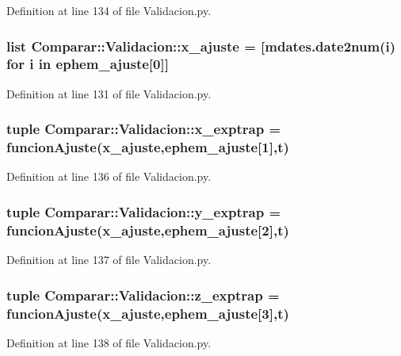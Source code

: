 \-Definition at line 134 of file \-Validacion.\-py.

\subsubsection[{x\-\_\-ajuste}]{\setlength{\rightskip}{0pt plus 5cm}list {\bf \-Comparar\-::\-Validacion\-::x\-\_\-ajuste} = [mdates.\-date2num(i) for i in {\bf ephem\-\_\-ajuste}[0]]}\label{namespace_comparar_1_1_validacion_aca12cea5660c813bec7e35242b7fd3ea}


\-Definition at line 131 of file \-Validacion.\-py.

\subsubsection[{x\-\_\-exptrap}]{\setlength{\rightskip}{0pt plus 5cm}tuple {\bf \-Comparar\-::\-Validacion\-::x\-\_\-exptrap} = {\bf funcion\-Ajuste}({\bf x\-\_\-ajuste},{\bf ephem\-\_\-ajuste}[1],{\bf t})}\label{namespace_comparar_1_1_validacion_a4524cef3e183e832ba7bd2768c2d9c6d}


\-Definition at line 136 of file \-Validacion.\-py.

\subsubsection[{y\-\_\-exptrap}]{\setlength{\rightskip}{0pt plus 5cm}tuple {\bf \-Comparar\-::\-Validacion\-::y\-\_\-exptrap} = {\bf funcion\-Ajuste}({\bf x\-\_\-ajuste},{\bf ephem\-\_\-ajuste}[2],{\bf t})}\label{namespace_comparar_1_1_validacion_a1decdda0bf36d2c48a4ed1ab3a7fe979}


\-Definition at line 137 of file \-Validacion.\-py.

\subsubsection[{z\-\_\-exptrap}]{\setlength{\rightskip}{0pt plus 5cm}tuple {\bf \-Comparar\-::\-Validacion\-::z\-\_\-exptrap} = {\bf funcion\-Ajuste}({\bf x\-\_\-ajuste},{\bf ephem\-\_\-ajuste}[3],{\bf t})}\label{namespace_comparar_1_1_validacion_afc26cc5b791aa90774c7707c18dcc47f}


\-Definition at line 138 of file \-Validacion.\-py.

